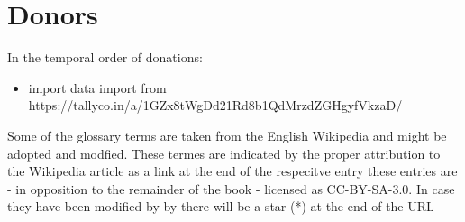\documentclass[ebook,12pt,oneside,openany]{memoir}
\begin{document}
\section{Donors}
In the temporal order of donations:
\begin{itemize}
\item import data import from https://tallyco.in/a/1GZx8tWgDd21Rd8b1QdMrzdZGHgyfVkzaD/


\end{itemize}

\glsaddall

Some of the glossary terms are taken from the English Wikipedia and might be adopted and modfied. These termes are indicated by the proper attribution to the Wikipedia article as a link at the end of the respecitve entry these entries are - in opposition to the remainder of the book - licensed as CC-BY-SA-3.0. In case they have been modified by by there will be a star (*) at the end of the URL

\printnoidxglossaries
\end{document}

